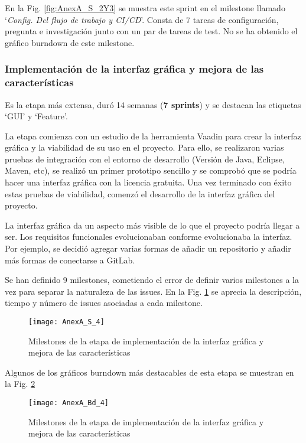 En la Fig. \ref{fig:AnexA_S_2Y3} se muestra este sprint en el milestone llamado `\textit{Config. Del flujo de trabajo y CI/CD}'. Consta de 7 tareas de configuración, pregunta e investigación junto con un par de tareas de test. No se ha obtenido el gráfico burndown de este milestone.

\subsubsection{Implementación de la interfaz gráfica y mejora de las características}

Es la etapa más extensa, duró 14 semanas (\textbf{7 sprints}) y se destacan las etiquetas `GUI' y `Feature'. 

La etapa comienza con un estudio de la herramienta Vaadin para crear la interfaz gráfica y la viabilidad de su uso en el proyecto. Para ello, se realizaron varias pruebas de integración con el entorno de desarrollo (Versión de Java, Eclipse, Maven, etc), se realizó un primer prototipo sencillo y se comprobó que se podría hacer una interfaz gráfica con la licencia gratuita. Una vez terminado con éxito estas pruebas de viabilidad, comenzó el desarrollo de la interfaz gráfica del proyecto.

La interfaz gráfica da un aspecto más visible de lo que el proyecto podría llegar a ser. Los requisitos funcionales evolucionaban conforme evolucionaba la interfaz. Por ejemplo, se decidió agregar varias formas de añadir un repositorio y añadir más formas de conectarse a GitLab.


Se han definido 9 milestones, cometiendo el error de definir varios milestones a la vez para separar la naturaleza de las issues. En la Fig. \ref{fig:AnexA_S_4} se aprecia la descripción, tiempo y número de issues asociadas a cada milestone.

\begin{figure}[!h]
	\centering
	\texttt{[image: AnexA\_S\_4]}
	\caption{Milestones de la etapa de implementación de la interfaz gráfica y mejora de las características}
	\label{fig:AnexA_S_4}
\end{figure}
\FloatBarrier

Algunos de los gráficos burndown más destacables de esta etapa se muestran en la Fig. \ref{fig:AnexA_Bd_4}

\begin{figure}[!h]
	\centering
	\texttt{[image: AnexA\_Bd\_4]}
	\caption{Milestones de la etapa de implementación de la interfaz gráfica y mejora de las características}
	\label{fig:AnexA_Bd_4}
\end{figure}
\FloatBarrier

